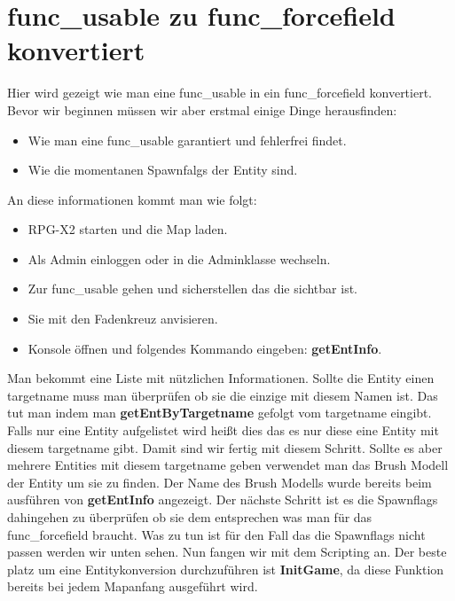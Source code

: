 \documentclass[11pt,a4paper]{book}
\begin{document}
\section{func\_usable zu func\_forcefield konvertiert}
\label{howto-usabletoforcefield}
Hier wird gezeigt wie man eine func\_usable in ein func\_forcefield konvertiert. Bevor wir beginnen müssen wir aber erstmal einige Dinge herausfinden:
\begin{itemize}
    \item Wie man eine func\_usable garantiert und fehlerfrei findet. 
    \item Wie die momentanen Spawnfalgs der Entity sind.
\end{itemize}
An diese informationen kommt man wie folgt:
\begin{itemize}
    \item RPG-X2 starten und die Map laden.
    \item Als Admin einloggen oder in die Adminklasse wechseln.
    \item Zur func\_usable gehen und sicherstellen das die sichtbar ist.
    \item Sie mit den Fadenkreuz anvisieren.
    \item Konsole öffnen und folgendes Kommando eingeben: \textbf{getEntInfo}.
\end{itemize}
Man bekommt eine Liste mit nützlichen Informationen. Sollte die Entity einen targetname muss man überprüfen ob sie die einzige mit diesem Namen ist. Das tut man indem man \textbf{getEntByTargetname} gefolgt vom targetname eingibt. Falls nur eine Entity aufgelistet wird heißt dies das es nur diese eine Entity mit diesem targetname gibt. Damit sind wir fertig mit diesem Schritt.
\newline
Sollte es aber mehrere Entities mit diesem targetname geben verwendet man das Brush Modell der Entity um sie zu finden. Der Name des Brush Modells wurde bereits beim ausführen von \textbf{getEntInfo} angezeigt.
\newline
Der nächste Schritt ist es die Spawnflags dahingehen zu überprüfen ob sie dem entsprechen was man für das func\_forcefield braucht. Was zu tun ist für den Fall das die Spawnflags nicht passen werden wir unten sehen.
\newline
Nun fangen wir mit dem Scripting an. Der beste platz um eine Entitykonversion durchzuführen ist \textbf{InitGame}, da diese Funktion bereits bei jedem Mapanfang ausgeführt wird.


\end{document}
